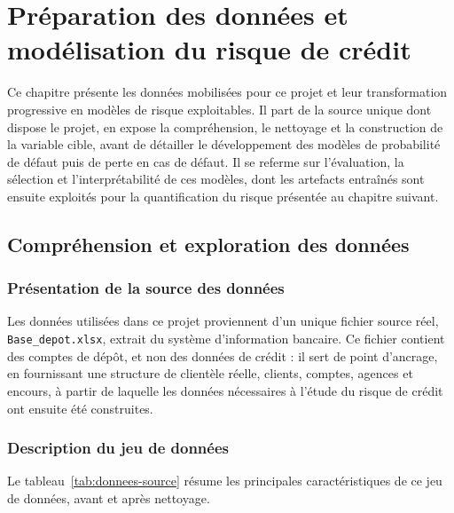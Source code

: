\chapter{Préparation des données et modélisation du risque de crédit}

Ce chapitre présente les données mobilisées pour ce projet et leur transformation progressive en modèles de risque exploitables. Il part de la source unique dont dispose le projet, en expose la compréhension, le nettoyage et la construction de la variable cible, avant de détailler le développement des modèles de probabilité de défaut puis de perte en cas de défaut. Il se referme sur l'évaluation, la sélection et l'interprétabilité de ces modèles, dont les artefacts entraînés sont ensuite exploités pour la quantification du risque présentée au chapitre suivant.

\section{Compréhension et exploration des données}

\subsection{Présentation de la source des données}

Les données utilisées dans ce projet proviennent d'un unique fichier source réel, \texttt{Base\_depot.xlsx}, extrait du système d'information bancaire. Ce fichier contient des comptes de dépôt, et non des données de crédit : il sert de point d'ancrage, en fournissant une structure de clientèle réelle, clients, comptes, agences et encours, à partir de laquelle les données nécessaires à l'étude du risque de crédit ont ensuite été construites.

\subsection{Description du jeu de données}

Le tableau~\ref{tab:donnees-source} résume les principales caractéristiques de ce jeu de données, avant et après nettoyage.

